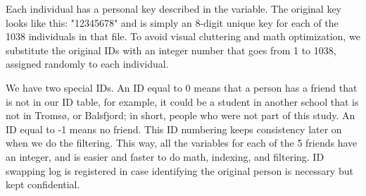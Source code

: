 Each individual has a personal key described in the  variable. The original key looks like this: "12345678" and is simply an 8-digit unique key for each of the 1038 individuals in that file. To avoid visual cluttering and math optimization, we substitute the original IDs with an integer number that goes from 1 to 1038, assigned randomly to each individual.

We have two special IDs. An ID equal to 0 means that a person has a friend that is not in our ID table, for example, it could be a student in another school that is not in Tromsø, or Balsfjord; in short, people who were not part of this study. An ID equal to -1 means no friend. This ID numbering keeps consistency later on when we do the filtering. This way, all the variables for each of the 5 friends have an integer, and is easier and faster to do math, indexing, and filtering. ID swapping log is registered in case identifying the original person is necessary but kept confidential.









